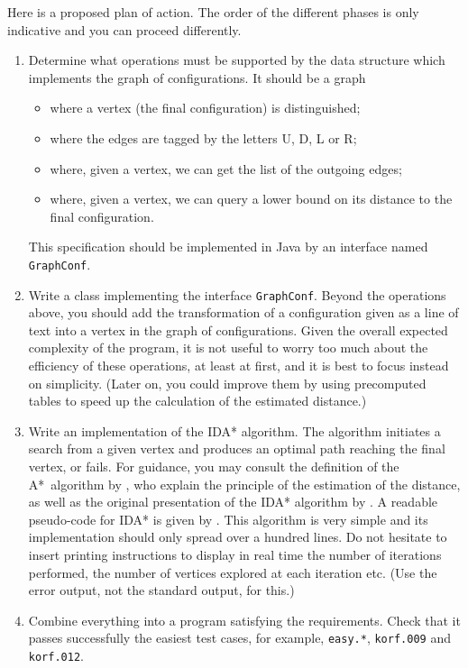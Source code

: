 \documentclass[11pt,a4paper]{article}
\begin{document}
Here is a proposed plan of action. The order of the different phases
is only indicative and you can proceed differently.
\begin{enumerate}

\item Determine what operations must be supported by the data
  structure which implements the graph of configurations. It should be
  a graph
  \begin{itemize}

    \item where a vertex (the final configuration) is distinguished;

    \item where the edges are tagged by the letters U, D, L or R;

    \item where, given a vertex, we can get the list of the outgoing
      edges;

    \item where, given a vertex, we can query a lower bound on its
      distance to the final configuration.

  \end{itemize}
  This specification should be implemented in \textsf{Java} by an
  interface named \texttt{GraphConf}.

\item Write a class implementing the interface
  \texttt{GraphConf}. Beyond the operations above, you should add the
  transformation of a configuration given as a line of text into a
  vertex in the graph of configurations. Given the overall expected
  complexity of the program, it is not useful to worry too much about
  the efficiency of these operations, at least at first, and it is
  best to focus instead on simplicity. (Later on, you could improve
  them by using precomputed tables to speed up the calculation of the
  estimated distance.)

\item Write an implementation of the IDA* algorithm. The algorithm
  initiates a search from a given vertex and produces an optimal path
  reaching the final vertex, or fails. For guidance, you may consult
  the definition of the A*~algorithm by \cite{hart-68}, who explain
  the principle of the estimation of the distance, as well as the
  original presentation of the IDA* algorithm by \cite{korf-85}. A
  readable pseudo\hyp{}code for IDA* is given by
  \cite{reinefeld-marsland-93}. This algorithm is very simple and its
  implementation should only spread over a hundred lines. Do not
  hesitate to insert printing instructions to display in real time the
  number of iterations performed, the number of vertices explored at
  each iteration etc. (Use the error output, not the standard output,
  for this.)

\item Combine everything into a program satisfying the
  requirements. Check that it passes successfully the easiest test
  cases, for example, \texttt{easy.*}, \texttt{korf.009} and
  \texttt{korf.012}.

\end{enumerate}
\end{document}
